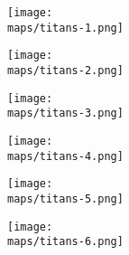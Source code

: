 \vspace{-3em}

\begin{minipage}{0.4\paperwidth}
  \centering
  \texttt{[image: \\maps/titans-1.png]}
\end{minipage}
\begin{minipage}{0.4\paperwidth}
  \centering
  \texttt{[image: \\maps/titans-2.png]}
\end{minipage}
\vspace{1em}
\linebreak
\begin{minipage}{0.4\paperwidth}
  \centering
  \texttt{[image: \\maps/titans-3.png]}
\end{minipage}
\begin{minipage}{0.4\paperwidth}
  \centering
  \texttt{[image: \\maps/titans-4.png]}
\end{minipage}
\vspace{1em}
\linebreak
\begin{minipage}{0.4\paperwidth}
  \hfill
  \texttt{[image: \\maps/titans-5.png]}
\end{minipage}
\begin{minipage}{0.4\paperwidth}
  \vspace{1em}
  \hfill
  \texttt{[image: \\maps/titans-6.png]}
\end{minipage}
